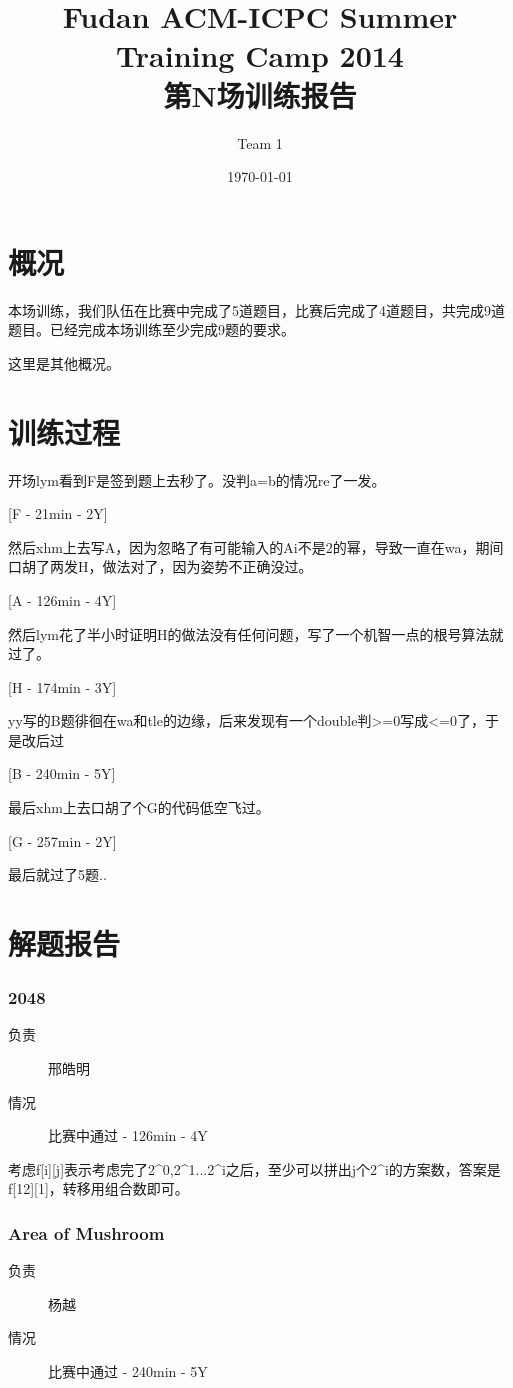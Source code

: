 \documentclass[a4paper, 11pt, nofonts, nocap, fancyhdr]{ctexart}
\title{Fudan ACM-ICPC Summer Training Camp 2014\\第N场训练报告}
\author{Team 1}
\date{\today}
\newcommand{\problem}[1]{\subsubsection{#1}}
\begin{document}
\maketitle

\section{概况}

本场训练，我们队伍在比赛中完成了5道题目，比赛后完成了4道题目，共完成9道题目。已经完成本场训练至少完成9题的要求。

这里是其他概况。

\section{训练过程}

开场lym看到F是签到题上去秒了。没判a=b的情况re了一发。

[F - 21min - 2Y]

然后xhm上去写A，因为忽略了有可能输入的Ai不是2的幂，导致一直在wa，期间口胡了两发H，做法对了，因为姿势不正确没过。

[A - 126min - 4Y]

然后lym花了半小时证明H的做法没有任何问题，写了一个机智一点的根号算法就过了。

[H - 174min - 3Y]

yy写的B题徘徊在wa和tle的边缘，后来发现有一个double判>=0写成<=0了，于是改后过

[B - 240min - 5Y]

最后xhm上去口胡了个G的代码低空飞过。

[G - 257min - 2Y]

最后就过了5题..

\section{解题报告}

\problem{2048}

\begin{description}
\item[负责] 邢皓明
\item[情况] 比赛中通过 - 126min - 4Y
\end{description}

考虑f[i][j]表示考虑完了2^0,2^1...2^i之后，至少可以拼出j个2^i的方案数，答案是f[12][1]，转移用组合数即可。

\problem{Area of Mushroom}

\begin{description}
\item[负责] 杨越
\item[情况] 比赛中通过 - 240min - 5Y
\end{description}
\end{document}
